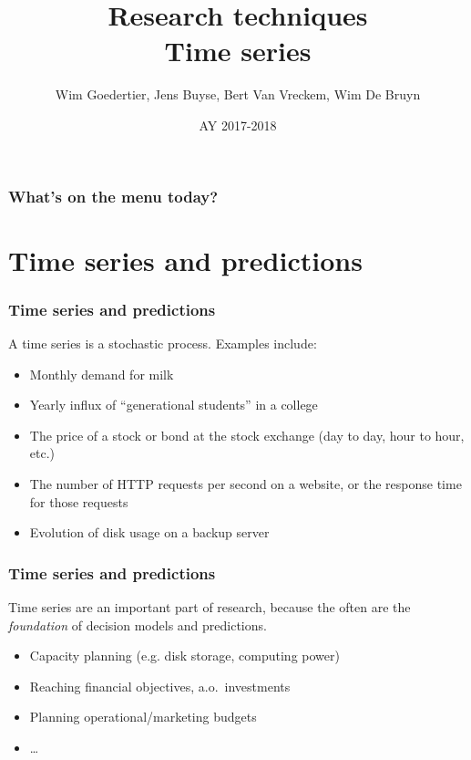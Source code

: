 \documentclass{beamer}
\title[Intro]{Research techniques\\Time series}
\author{Wim Goedertier, Jens Buyse, Bert {Van Vreckem}, Wim {De Bruyn}}
\date{AY 2017-2018}
\begin{document}

\HoGentLogo

\titleframe


\begin{frame}
  \frametitle{What's on the menu today?}

  \tableofcontents
\end{frame}

\section{Time series and predictions}

\begin{frame}
  \frametitle{Time series and predictions}


  A time series is a stochastic process. Examples include:

  \begin{itemize}
    \item Monthly demand for milk
    \item Yearly influx of ``generational students'' in a college
    \item The price of a stock or bond at the stock exchange (day to day, hour to hour, etc.)
    \item The number of HTTP requests per second on a website, or the response time for those requests
    \item Evolution of disk usage on a backup server
  \end{itemize}
\end{frame}

\begin{frame}
  \frametitle{Time series and predictions}
  
  Time series are an important part of research, because the often are the \emph{foundation} of decision models and predictions.
  
  \begin{itemize}
    \item Capacity planning (e.g. disk storage, computing power)
    \item Reaching financial objectives, a.o.~investments
    \item Planning operational/marketing budgets
    \item \dots
  \end{itemize}
\end{frame}
\end{document}
